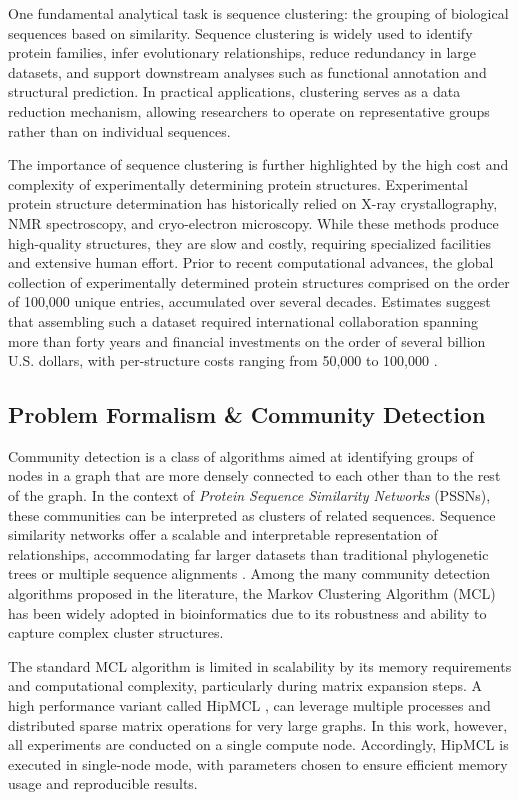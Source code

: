One fundamental analytical task is sequence clustering: the grouping of
biological sequences based on similarity. Sequence clustering is widely used to
identify protein families, infer evolutionary relationships, reduce redundancy
in large datasets, and support downstream analyses such as functional
annotation and structural prediction. In practical applications, clustering
serves as a data reduction mechanism, allowing researchers to operate on
representative groups rather than on individual sequences.

The importance of sequence clustering is further highlighted by the high cost
and complexity of experimentally determining protein structures. Experimental
protein structure determination has historically relied on X-ray
crystallography, NMR spectroscopy, and cryo-electron microscopy. While these
methods produce high-quality structures, they are slow and costly, requiring
specialized facilities and extensive human effort. Prior to recent
computational advances, the global collection of experimentally determined
protein structures comprised on the order of 100,000 unique entries,
accumulated over several decades. Estimates suggest that assembling such a
dataset required international collaboration spanning more than forty years and
financial investments on the order of several billion U.S. dollars, with
per-structure costs ranging from 50,000 to 100,000 \cite{PNNL13501}.

\subsection*{Problem Formalism \& Community Detection}

Community detection is a class of algorithms aimed at identifying groups of
nodes in a graph that are more densely connected to each other than to the rest
of the graph. In the context of \textit{Protein Sequence Similarity Networks}
(PSSNs), these communities can be interpreted as clusters of related sequences.
Sequence similarity networks offer a scalable and interpretable representation
of relationships, accommodating far larger datasets than traditional
phylogenetic trees or multiple sequence alignments \cite{ssn}. Among the many
community detection algorithms proposed in the literature, the Markov
Clustering Algorithm (MCL) \cite{mcl} has been widely adopted in bioinformatics
due to its robustness and ability to capture complex cluster structures.

The standard MCL algorithm is limited in scalability by its memory requirements
and computational complexity, particularly during matrix expansion steps.
A high performance variant called HipMCL \cite{hipmcl}, can leverage multiple
processes and distributed sparse matrix operations for very large graphs. In
this work, however, all experiments are conducted on a single compute node.
Accordingly, HipMCL is executed in single-node mode, with parameters chosen to
ensure efficient memory usage and reproducible results.


